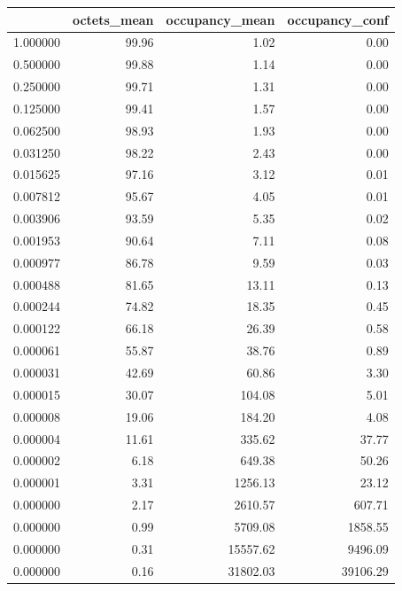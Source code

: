 \begin{tabular}{lrrr}
\toprule
 & octets_mean & occupancy_mean & occupancy_conf \\
\midrule
1.000000 & 99.96 & 1.02 & 0.00 \\
0.500000 & 99.88 & 1.14 & 0.00 \\
0.250000 & 99.71 & 1.31 & 0.00 \\
0.125000 & 99.41 & 1.57 & 0.00 \\
0.062500 & 98.93 & 1.93 & 0.00 \\
0.031250 & 98.22 & 2.43 & 0.00 \\
0.015625 & 97.16 & 3.12 & 0.01 \\
0.007812 & 95.67 & 4.05 & 0.01 \\
0.003906 & 93.59 & 5.35 & 0.02 \\
0.001953 & 90.64 & 7.11 & 0.08 \\
0.000977 & 86.78 & 9.59 & 0.03 \\
0.000488 & 81.65 & 13.11 & 0.13 \\
0.000244 & 74.82 & 18.35 & 0.45 \\
0.000122 & 66.18 & 26.39 & 0.58 \\
0.000061 & 55.87 & 38.76 & 0.89 \\
0.000031 & 42.69 & 60.86 & 3.30 \\
0.000015 & 30.07 & 104.08 & 5.01 \\
0.000008 & 19.06 & 184.20 & 4.08 \\
0.000004 & 11.61 & 335.62 & 37.77 \\
0.000002 & 6.18 & 649.38 & 50.26 \\
0.000001 & 3.31 & 1256.13 & 23.12 \\
0.000000 & 2.17 & 2610.57 & 607.71 \\
0.000000 & 0.99 & 5709.08 & 1858.55 \\
0.000000 & 0.31 & 15557.62 & 9496.09 \\
0.000000 & 0.16 & 31802.03 & 39106.29 \\
\bottomrule
\end{tabular}
